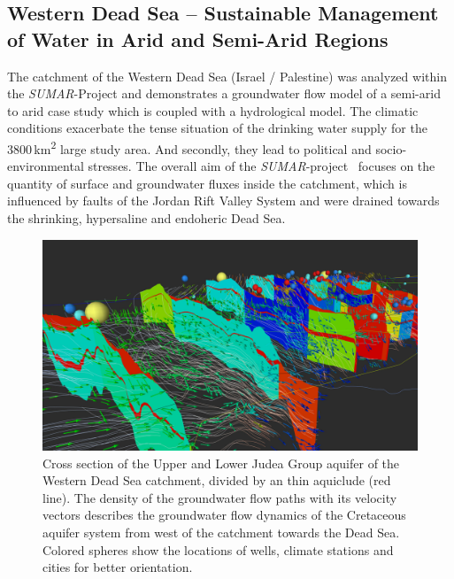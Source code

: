 \documentclass[twocolumn]{svjour3}          %
\begin{document}
\subsection{Western Dead Sea -- Sustainable Management of Water in Arid and Semi-Arid
Regions}
\label{western-dead-sea---sustainable-management-of-water-in-arid-and-semi-arid-regions}

The catchment of the Western Dead Sea (Israel / Palestine) was analyzed within the \emph{SUMAR}-Project and de\-mon\-strates a groundwater flow model of a semi-arid to arid case study which is coupled with a hydrological model. The climatic conditions exacerbate the tense situation of the drinking water supply for the 3800\,km\textsuperscript{2} large study area. And secondly, they lead to political and socio-environmental stresses. The overall aim of the \emph{SU\-MAR}-project~\cite{Siebert:2014} focuses on the quantity of surface and groundwater fluxes inside the catchment, which is influenced by faults of the Jordan Rift Valley System and were drained towards the shrinking, hypersaline and endoheric Dead Sea.

\begin{figure}[htb]
  \includegraphics[width=\linewidth]{images/deadsea.jpg}
\caption{Cross section of the Upper and Lower Judea Group aquifer of the Western Dead Sea catchment, divided by an thin aquiclude (red line). The density of the groundwater flow paths with its velocity vectors describes the groundwater flow dynamics of the Cretaceous aquifer system from west of the catchment towards the Dead Sea. Colored spheres show the locations of wells, climate stations and cities for better orientation.}
\label{fig:deadsea}
\end{figure}
\end{document}
